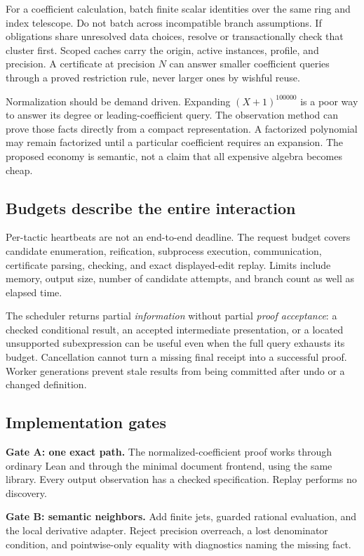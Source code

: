 \documentclass[11pt,a4paper]{article}
\theoremstyle{definition}
\begin{document}
For a coefficient calculation, batch finite scalar identities over the same
ring and index telescope. Do not batch across incompatible branch assumptions.
If obligations share unresolved data choices, resolve or transactionally check
that cluster first. Scoped caches carry the origin, active instances, profile,
and precision. A certificate at precision \(N\) can answer smaller coefficient
queries through a proved restriction rule, never larger ones by wishful reuse.

Normalization should be demand driven. Expanding \((X+1)^{100000}\) is a poor
way to answer its degree or leading-coefficient query. The observation method
can prove those facts directly from a compact representation. A factorized
polynomial may remain factorized until a particular coefficient requires an
expansion. The proposed economy is semantic, not a claim that all expensive
algebra becomes cheap.

\subsection{Budgets describe the entire interaction}
Per-tactic heartbeats are not an end-to-end deadline. The request budget covers
candidate enumeration, reification, subprocess execution, communication,
certificate parsing, checking, and exact displayed-edit replay. Limits include
memory, output size, number of candidate attempts, and branch count as well as
elapsed time.

The scheduler returns partial \emph{information} without partial \emph{proof
acceptance}: a checked conditional result, an accepted intermediate presentation,
or a located unsupported subexpression can be useful even when the full query
exhausts its budget. Cancellation cannot turn a missing final receipt into a
successful proof. Worker generations prevent stale results from being committed
after undo or a changed definition.

\subsection{Implementation gates}
\textbf{Gate A: one exact path.} The normalized-coefficient proof works through
ordinary Lean and through the minimal document frontend, using the same library.
Every output observation has a checked specification. Replay performs no discovery.

\textbf{Gate B: semantic neighbors.} Add finite jets, guarded rational evaluation,
and the local derivative adapter. Reject precision overreach, a lost denominator
condition, and pointwise-only equality with diagnostics naming the missing fact.
\end{document}
